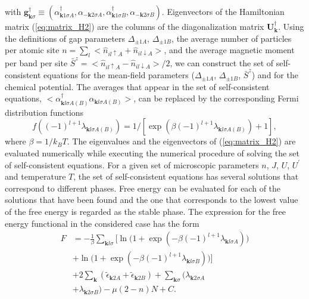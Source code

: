 \documentclass[aps,prb,showpacs,reprint]{revtex4-1}
\begin{document}
with
$\mathbf{g}^{\dagger}_{\mathbf{k}\sigma}\equiv(\alpha^{\dagger}
_{\mathbf{k}1\sigma A},\alpha_{-\mathbf{k}
2\sigma A},\alpha^{\dagger}_{\mathbf{k}1\sigma
B},\alpha_{-\mathbf{k}2\sigma B})$. Eigenvectors of the
Hamiltonian matrix (\ref{eq:matrix_H2}) are the columns of the diagonalization
matrix $\mathbf{U}^{\dagger}_{\mathbf{k}}$. 
Using the definitions of gap parameters $\Delta_{\pm 1 A}$, $\Delta_{\pm 1 B}$,
the average number of particles per atomic site $n=\sum_l<\hat{n}_{il\uparrow
A}+\hat{n}_{il\downarrow A}>$, and the average magnetic moment per band per site
$\bar{S}^z=<\hat{n}_{il\uparrow A}-\hat{n}_{il\downarrow A}>/2$, we can
construct
the set of self-consistent equations for the mean-field parameters ($\Delta_{\pm
1A}$, $\Delta_{\pm 1B}$, $\bar{S}^z$) and for the chemical potential. The averages
that appear in the set of self-consistent equations,
$<\alpha^{\dagger}_{\mathbf{k}l\sigma A(B)}\alpha_{\mathbf{k}l\sigma A(B)}>$,
can
be replaced by the corresponding Fermi distribution functions
\begin{equation}
f((-1)^{l+1}\lambda_{\mathbf{k}l\sigma A(B)})=1/[\exp(\beta
(-1)^{l+1}\lambda_{\mathbf{k}l\sigma A(B)})+1],
\end{equation}
where $\beta=1/k_BT$. The eigenvalues and the
eigenvectors of (\ref{eq:matrix_H2}) are evaluated numerically while
executing the numerical procedure of
solving the set of self-consistent equations. For a given set of microscopic
parameters $n$, $J$, $U$, $U^{\prime}$ and temperature $T$, the set of
self-consistent
equations has several solutions that correspond to different phases. Free
energy can be evaluated for each of the solutions that have been found and the
one
that corresponds to the lowest value of the free energy is regarded as
the stable phase. The expression for the free energy functional in the
considered case has the form
\begin{equation}
\begin{split}
 F&=-\frac{1}{\beta}\sum_{\mathbf{k}l\sigma}\bigg[\ln \bigg(1+\exp
 (-\beta(-1)^{l+1}\lambda_{\mathbf{k}l\sigma A})\bigg)\\
&+\ln \bigg(1+\exp
 (-\beta(-1)^{l+1}\lambda_{\mathbf{k}l\sigma
B})\bigg)\bigg]\\
&+2\sum_{\mathbf{k}}(\tilde{\epsilon}_{\mathbf{k}2
 A}+\tilde{\epsilon}_{\mathbf{k}2 B}
 )+\sum_{\mathbf{k}\sigma}(\lambda_{\mathbf{k}2\sigma
 A}\\
&+\lambda_{\mathbf{k}2\sigma B})-\mu (2-n)N+C.
\end{split}
\end{equation}
\end{document}
